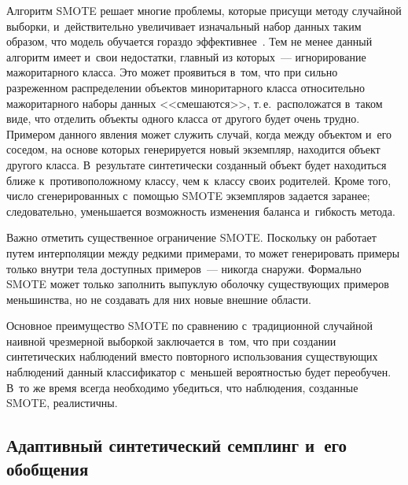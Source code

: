 \begin{multicols}{2}
 Алгоритм SMOTE решает многие проблемы, которые присущи методу случайной 
выборки, и~действительно увеличивает изначальный набор данных таким 
образом, что модель обучается гораздо эффективнее~\cite{9-sev}. Тем не менее 
данный алгоритм имеет и~свои недостатки, главный из которых~--- 
игнорирование мажоритарного класса. Это может проявиться в~том, что при 
сильно разреженном распределении объектов миноритарного класса 
относительно мажоритарного наборы данных <<смешаются>>, т.\,е.\ 
расположатся в~таком виде, что отделить объекты одного класса от другого 
будет очень трудно. Примером данного явления может служить случай, когда
между объектом и~его соседом, на основе которых генерируется новый 
экземпляр, находится объект другого класса. В~результате синтетически 
созданный объект будет находиться ближе к~противоположному классу, чем 
к~классу своих родителей. Кроме того, число сгенерированных с~помощью 
SMOTE экземпляров задается заранее; следовательно, уменьшается 
возможность изменения баланса и~гибкость метода. 

Важно отметить 
существенное ограничение SMOTE. Поскольку он работает путем 
интерполяции между редкими примерами, то может генерировать примеры 
только внутри тела доступных примеров~--- никогда снаружи. Формально 
SMOTE может только заполнить выпуклую оболочку существующих примеров 
меньшинства, но не создавать для них новые внешние области. 

Основное 
преимущество SMOTE по сравнению с~традиционной случайной наивной 
чрезмерной выборкой заключается в~том, что при создании синтетических 
наблюдений вместо повторного использования существующих наблюдений 
данный классификатор с~меньшей вероятностью будет переобучен. В~то же 
время всегда необходимо убедиться, что наблюдения, созданные SMOTE, 
реалистичны.
  
  
  
  \subsection{Адаптивный синтетический семплинг и~его обобщения}
  

\end{multicols}

